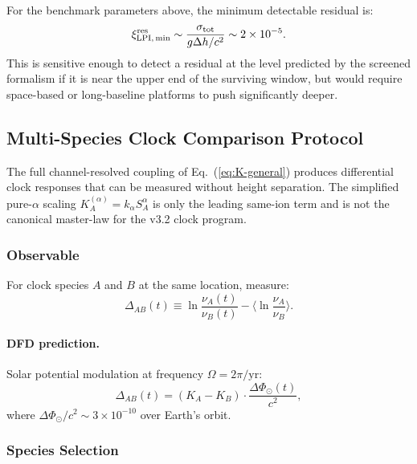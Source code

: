 For the benchmark parameters above, the minimum detectable residual is:
\begin{equation}
\xi_{\rm LPI,\,min}^{\rm res} \sim \frac{\sigma_{\mathrm{tot}}}{g\Delta h/c^2} \sim 2 \times 10^{-5}.
\end{equation}
This is sensitive enough to detect a residual at the level predicted by the screened formalism if it is near the upper end of the surviving window, but would require space-based or long-baseline platforms to push significantly deeper.

\subsection{Multi-Species Clock Comparison Protocol}\label{app:proto-clocks}

The full channel-resolved coupling of Eq.~(\ref{eq:K-general}) produces 
differential clock responses that can be measured without height separation.
The simplified pure-$\alpha$ scaling $K_A^{(\alpha)} = k_\alpha S_A^\alpha$
is only the leading same-ion term and is not the canonical master-law for
the v3.2 clock program.

\subsubsection{Observable}

For clock species $A$ and $B$ at the same location, measure:
\begin{equation}
\Delta_{AB}(t) \equiv \ln\frac{\nu_A(t)}{\nu_B(t)} - \langle \ln\frac{\nu_A}{\nu_B} \rangle.
\end{equation}

\paragraph{DFD prediction.}
Solar potential modulation at frequency $\Omega = 2\pi/\text{yr}$:
\begin{equation}
\Delta_{AB}(t) = (K_A - K_B) \cdot \frac{\Delta\Phi_\odot(t)}{c^2},
\end{equation}
where $\Delta\Phi_\odot/c^2 \sim 3 \times 10^{-10}$ over Earth's orbit.

\subsubsection{Species Selection}

